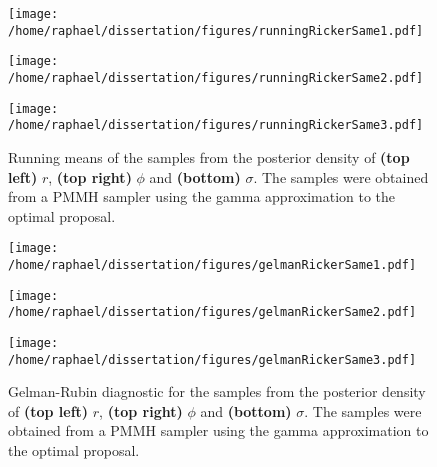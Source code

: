 \documentclass[12pt]{article}
\begin{document}
\begin{appendices}
\clearpage
\thispagestyle{empty}
	\begin{figure}[htb]
		\centering
		\begin{minipage}{0.6\textwidth}
			\centering
			\texttt{[image: /home/raphael/dissertation/figures/runningRickerSame1.pdf]}
		\end{minipage}
		\begin{minipage}{0.6\textwidth}
			\centering
			\texttt{[image: /home/raphael/dissertation/figures/runningRickerSame2.pdf]}
		\end{minipage}
		\begin{minipage}{0.6\textwidth}
			\centering
			\texttt{[image: /home/raphael/dissertation/figures/runningRickerSame3.pdf]}
		\end{minipage}
		\caption[Running means of a run of a PMMH sampler on data simulated from the Ricker model]{Running means of the samples from the posterior density of \textbf{(top left)} $r$, \textbf{(top right)} $\phi$ and \textbf{(bottom)} $\sigma$. The samples were obtained from a PMMH sampler using the gamma approximation to the optimal proposal.}
		\label{fig:rmDiag}
	\end{figure}
	
\clearpage
\thispagestyle{empty}
	\begin{figure}[htb]
		\centering
		\begin{minipage}{0.6\textwidth}
			\centering
			\texttt{[image: /home/raphael/dissertation/figures/gelmanRickerSame1.pdf]}
		\end{minipage}
		\begin{minipage}{0.6\textwidth}
			\centering
			\texttt{[image: /home/raphael/dissertation/figures/gelmanRickerSame2.pdf]}
		\end{minipage}
		\begin{minipage}{0.6\textwidth}
			\centering
			\texttt{[image: /home/raphael/dissertation/figures/gelmanRickerSame3.pdf]}
		\end{minipage}
		\caption[Gelman-Rubin diagnostic of the chains of a PMMH sampler on data simulated from the Ricker model]{Gelman-Rubin diagnostic for the samples from the posterior density of \textbf{(top left)} $r$, \textbf{(top right)} $\phi$ and \textbf{(bottom)} $\sigma$. The samples were obtained from a PMMH sampler using the gamma approximation to the optimal proposal.}
		\label{fig:gelmanDiag}
	\end{figure}
\clearpage
{}

\end{appendices}
\end{document}
